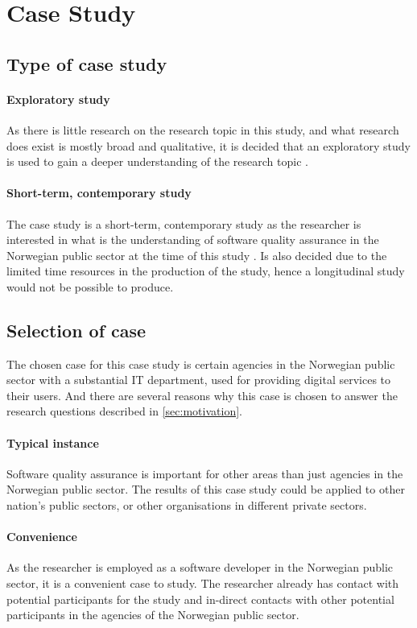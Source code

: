 \section{Case Study}

\subsection{Type of case study}
\paragraph{Exploratory study}
As there is little research on the research topic in this study, and what research does exist is mostly broad and qualitative, it is decided that an exploratory study is used to gain a deeper understanding of the research topic \cite{bjo_2022}.

\paragraph{Short-term, contemporary study} 
The case study is a short-term, contemporary study as the researcher is interested in what is the understanding of software quality assurance in the Norwegian public sector at the time of this study \cite{bjo_2022}. Is also decided due to the limited time resources in the production of the study, hence a longitudinal study would not be possible to produce.

\subsection{Selection of case}
The chosen case for this case study is certain agencies in the Norwegian public sector with a substantial IT department, used for providing digital services to their users. And there are several reasons why this case is chosen to answer the research questions described in \autoref{sec:motivation}.

\paragraph{Typical instance}
Software quality assurance is important for other areas than just agencies in the Norwegian public sector. The results of this case study could be applied to other nation's public sectors, or other organisations in different private sectors.

\paragraph{Convenience}
As the researcher is employed as a software developer in the Norwegian public sector, it is a convenient case to study. The researcher already has contact with potential participants for the study and in-direct contacts with other potential participants in the agencies of the Norwegian public sector.

